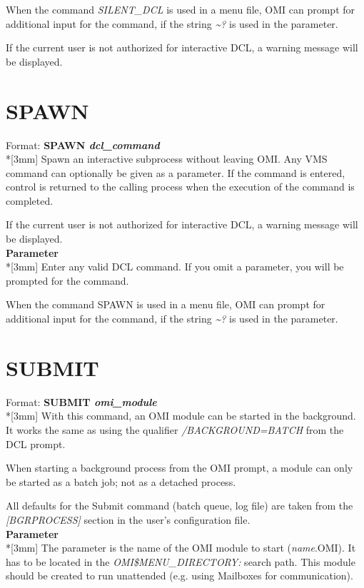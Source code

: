 \documentclass[a4paper]{book}
\newcommand{\vs}{\vspace{3mm}}
\renewcommand{\indent}{\hspace*{5mm}}
\begin{document}
When the command \textsl{SILENT{\_}DCL} is used in a menu file, OMI can prompt for 
additional input for the command, if the string \textsl{\~{}?} is used in the parameter.

If the current user is not authorized for interactive DCL, a warning message 
will be displayed.

\section{SPAWN}
\label{subsec:spawn}

\indent Format: \textbf{SPAWN \textit{dcl{\_}command}}\\*[3mm]
Spawn an interactive subprocess without leaving OMI. Any VMS command can 
optionally be given as a parameter. If the command is entered, control is 
returned to the calling process when the execution of the command is 
completed.

If the current user is not authorized for interactive DCL, a warning message 
will be displayed.\\[3mm]
\textbf{Parameter}\\*[3mm]
Enter any valid DCL command. If you omit a parameter, you will be prompted 
for the command.

When the command SPAWN is used in a menu file, OMI can prompt for additional 
input for the command, if the string \textsl{\~{}?} is used in the parameter.

\section{SUBMIT}
\label{subsec:submit}

\indent Format: \textbf{SUBMIT \textit{omi{\_}module}}\\*[3mm]
With this command, an OMI module can be started in the background. It works 
the same as using the qualifier \textsl{/BACKGROUND=BATCH} from the DCL 
prompt.

When starting a background process from the OMI prompt, a module can only be 
started as a batch job; not as a detached process. 

\vs

All defaults for the Submit command (batch queue, log file) are taken from 
the \textsl{[BGRPROCESS]} section in the user's configuration file.\\[3mm]
\textbf{Parameter}\\*[3mm]
The parameter is the name of the OMI module to start (\textit{name}.OMI). It has to be 
located in the \textsl{OMI{\$}MENU{\_}DIRECTORY:} search path. This module should be 
created to run unattended (e.g. using Mailboxes for communication).
\end{document}
